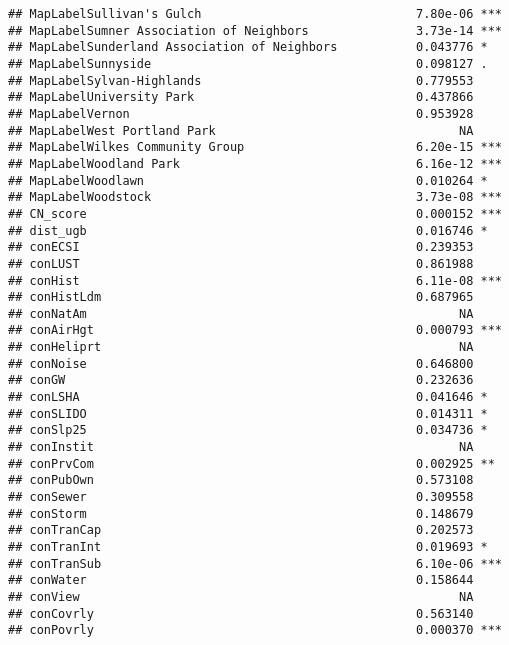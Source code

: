 \documentclass[]{article}
\begin{document}
\begin{verbatim}
## MapLabelSullivan's Gulch                              7.80e-06 ***
## MapLabelSumner Association of Neighbors               3.73e-14 ***
## MapLabelSunderland Association of Neighbors           0.043776 *  
## MapLabelSunnyside                                     0.098127 .  
## MapLabelSylvan-Highlands                              0.779553    
## MapLabelUniversity Park                               0.437866    
## MapLabelVernon                                        0.953928    
## MapLabelWest Portland Park                                  NA    
## MapLabelWilkes Community Group                        6.20e-15 ***
## MapLabelWoodland Park                                 6.16e-12 ***
## MapLabelWoodlawn                                      0.010264 *  
## MapLabelWoodstock                                     3.73e-08 ***
## CN_score                                              0.000152 ***
## dist_ugb                                              0.016746 *  
## conECSI                                               0.239353    
## conLUST                                               0.861988    
## conHist                                               6.11e-08 ***
## conHistLdm                                            0.687965    
## conNatAm                                                    NA    
## conAirHgt                                             0.000793 ***
## conHeliprt                                                  NA    
## conNoise                                              0.646800    
## conGW                                                 0.232636    
## conLSHA                                               0.041646 *  
## conSLIDO                                              0.014311 *  
## conSlp25                                              0.034736 *  
## conInstit                                                   NA    
## conPrvCom                                             0.002925 ** 
## conPubOwn                                             0.573108    
## conSewer                                              0.309558    
## conStorm                                              0.148679    
## conTranCap                                            0.202573    
## conTranInt                                            0.019693 *  
## conTranSub                                            6.10e-06 ***
## conWater                                              0.158644    
## conView                                                     NA    
## conCovrly                                             0.563140    
## conPovrly                                             0.000370 ***

\end{verbatim}
\end{document}
